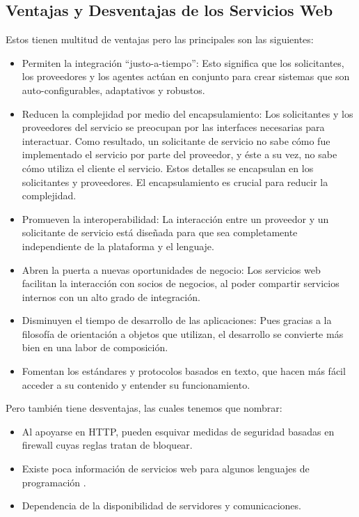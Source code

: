 \subsection{Ventajas y Desventajas de los  Servicios Web}
\label{cap:subsec:serviciosweb}
Estos tienen multitud de ventajas pero las principales son las siguientes:
\begin{itemize}
	 \item Permiten la integración “justo-a-tiempo”:  Esto significa que los solicitantes, los proveedores y los agentes actúan en conjunto para crear sistemas que son auto-configurables, adaptativos y robustos.
	\item Reducen la complejidad por medio del encapsulamiento: Los solicitantes y los proveedores del servicio se preocupan por las interfaces necesarias para interactuar. Como resultado, un solicitante de servicio no sabe cómo fue implementado el servicio por parte del proveedor, y éste a su vez, no sabe cómo utiliza el cliente el servicio. Estos detalles se encapsulan en los solicitantes y proveedores. El encapsulamiento es crucial para reducir la complejidad.
	\item Promueven la interoperabilidad: La interacción entre un proveedor y un solicitante de servicio está diseñada para que sea completamente independiente de la plataforma y el lenguaje. 
	\item Abren la puerta a nuevas oportunidades de negocio: Los servicios web facilitan la interacción con socios de negocios, al poder compartir servicios internos con un alto grado de integración.
	\item Disminuyen el tiempo de desarrollo de las aplicaciones: Pues gracias a la filosofía de orientación a objetos que utilizan, el desarrollo se convierte más bien en una labor de composición.
	\item Fomentan los estándares y protocolos basados en texto, que hacen más fácil acceder a su contenido y entender su funcionamiento.
\end{itemize}
Pero también tiene desventajas, las cuales tenemos que nombrar:
\begin{itemize}
	\item Al apoyarse en HTTP, pueden esquivar medidas de seguridad basadas en firewall cuyas reglas tratan de bloquear.
	\item Existe poca información de servicios web para algunos lenguajes de programación .
	\item Dependencia de la disponibilidad de servidores y comunicaciones.
\end{itemize}
